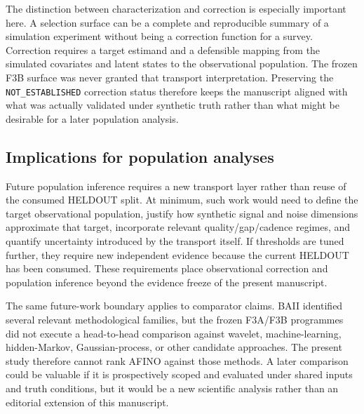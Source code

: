 \documentclass[11pt,a4paper]{article}
\renewcommand{\arraystretch}{1.08}
\begin{document}
\clearpage
\begin{landscape}
\begingroup
\setlength{\linewidth}{1.16\linewidth}
\setlength{\tabcolsep}{0.8pt}
\renewcommand{\arraystretch}{0.90}
\renewcommand{\small}{\fontsize{6.55}{7.15}\selectfont}
\let\moneoldunderscore\_
\renewcommand{\_}{\moneoldunderscore\allowbreak}
\renewcommand{\label}[1]{}

\endgroup
\end{landscape}
\clearpage

The distinction between characterization and correction is especially important here. A selection surface can be a complete and reproducible summary of a simulation experiment without being a correction function for a survey. Correction requires a target estimand and a defensible mapping from the simulated covariates and latent states to the observational population. The frozen F3B surface was never granted that transport interpretation. Preserving the \texttt{NOT\_ESTABLISHED} correction status therefore keeps the manuscript aligned with what was actually validated under synthetic truth rather than what might be desirable for a later population analysis.

\subsection{Implications for population analyses}
Future population inference requires a new transport layer rather than reuse of the consumed HELDOUT split. At minimum, such work would need to define the target observational population, justify how synthetic signal and noise dimensions approximate that target, incorporate relevant quality/gap/cadence regimes, and quantify uncertainty introduced by the transport itself. If thresholds are tuned further, they require new independent evidence because the current HELDOUT has been consumed. These requirements place observational correction and population inference beyond the evidence freeze of the present manuscript.

The same future-work boundary applies to comparator claims. BAII identified several relevant methodological families, but the frozen F3A/F3B programmes did not execute a head-to-head comparison against wavelet, machine-learning, hidden-Markov, Gaussian-process, or other candidate approaches. The present study therefore cannot rank AFINO against those methods. A later comparison could be valuable if it is prospectively scoped and evaluated under shared inputs and truth conditions, but it would be a new scientific analysis rather than an editorial extension of this manuscript.
\end{document}
